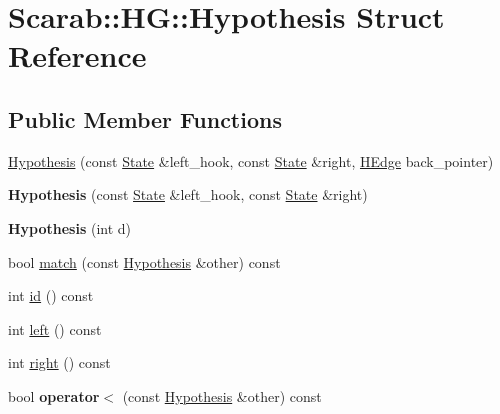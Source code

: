 \hypertarget{structScarab_1_1HG_1_1Hypothesis}{
\section{Scarab::HG::Hypothesis Struct Reference}
\label{structScarab_1_1HG_1_1Hypothesis}
}
\subsection*{Public Member Functions}
\begin{DoxyCompactItemize}
\item 
\hyperlink{structScarab_1_1HG_1_1Hypothesis_aca7357ce485cb960fadb2cc62f1a888a}{Hypothesis} (const \hyperlink{structScarab_1_1HG_1_1State}{State} \&left\_\-hook, const \hyperlink{structScarab_1_1HG_1_1State}{State} \&right, \hyperlink{classScarab_1_1HG_1_1Hyperedge}{HEdge} back\_\-pointer)
\item 
\hypertarget{structScarab_1_1HG_1_1Hypothesis_a0d71b86d0d7d3294e61671efed2722bf}{
{\bfseries Hypothesis} (const \hyperlink{structScarab_1_1HG_1_1State}{State} \&left\_\-hook, const \hyperlink{structScarab_1_1HG_1_1State}{State} \&right)}
\label{structScarab_1_1HG_1_1Hypothesis_a0d71b86d0d7d3294e61671efed2722bf}

\item 
\hypertarget{structScarab_1_1HG_1_1Hypothesis_a974fd973dd0c8a380f342bbd10013d6f}{
{\bfseries Hypothesis} (int d)}
\label{structScarab_1_1HG_1_1Hypothesis_a974fd973dd0c8a380f342bbd10013d6f}

\item 
bool \hyperlink{structScarab_1_1HG_1_1Hypothesis_a698008183fc3863a0c03ba0c3e5960d1}{match} (const \hyperlink{structScarab_1_1HG_1_1Hypothesis}{Hypothesis} \&other) const 
\item 
int \hyperlink{structScarab_1_1HG_1_1Hypothesis_a5a69f417c889d4d96ad5a78aa1dd2f7d}{id} () const 
\item 
int \hyperlink{structScarab_1_1HG_1_1Hypothesis_ac428cffa80bad102222f58463bfba7e5}{left} () const 
\item 
int \hyperlink{structScarab_1_1HG_1_1Hypothesis_a6c026d211fd4f4875216fc179a78e879}{right} () const 
\item 
\hypertarget{structScarab_1_1HG_1_1Hypothesis_a70597628ead54cb83fcda7422d6d2f1f}{
bool {\bfseries operator$<$} (const \hyperlink{structScarab_1_1HG_1_1Hypothesis}{Hypothesis} \&other) const }
\label{structScarab_1_1HG_1_1Hypothesis_a70597628ead54cb83fcda7422d6d2f1f}

\end{DoxyCompactItemize}
